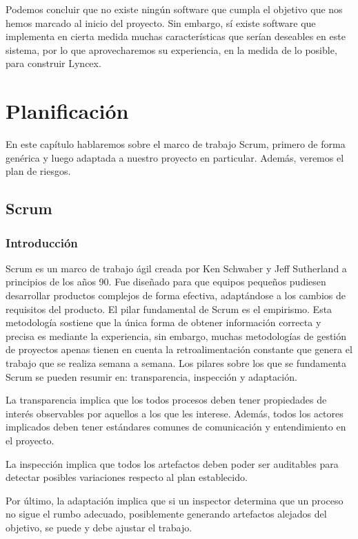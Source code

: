 \documentclass[12pt]{report} %
\begin{document}
Podemos concluir que no existe ningún software que cumpla el objetivo que nos hemos marcado al inicio del proyecto. Sin embargo, sí existe software que implementa en cierta medida muchas características que serían deseables en este sistema, por lo que aprovecharemos su experiencia, en la medida de lo posible, para construir Lyncex.

\chapter{Planificación}

En este capítulo hablaremos sobre el marco de trabajo Scrum\cite{scrum}, primero de forma genérica y luego adaptada a nuestro proyecto en particular. Además, veremos el plan de riesgos.
\section{Scrum}

\subsection{Introducción}
Scrum es un marco de trabajo ágil creada por Ken Schwaber y Jeff Sutherland a principios de los años 90. Fue diseñado para que equipos pequeños pudiesen desarrollar productos complejos de forma efectiva, adaptándose a los cambios de requisitos del producto.
El pilar fundamental de Scrum es el empirismo. Esta metodología sostiene que la única forma de obtener información correcta y precisa es mediante la experiencia, sin embargo, muchas metodologías de gestión de proyectos apenas tienen en cuenta la retroalimentación constante que genera el trabajo que se realiza semana a semana. Los pilares sobre los que se fundamenta Scrum se pueden resumir en: transparencia, inspección y adaptación.

La transparencia implica que los todos procesos deben tener propiedades de interés observables por aquellos a los que les interese. Además, todos los actores implicados deben tener estándares comunes de comunicación y entendimiento en el proyecto.

La inspección implica que todos los artefactos deben poder ser auditables para detectar posibles variaciones respecto al plan establecido.

Por último, la adaptación implica que si un inspector determina que un proceso no sigue el rumbo adecuado, posiblemente generando artefactos alejados del objetivo, se puede y debe ajustar el trabajo.
\end{document}
